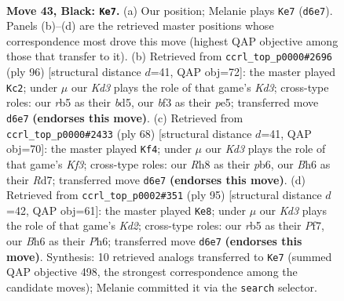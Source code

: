 \documentclass[11pt]{article}
\begin{document}
\clearpage

\begin{figure}[p]\centering
\begin{subfigure}{0.46\textwidth}\centering
\resizebox{\linewidth}{!}{%
\newchessgame
\chessboard[
  setfen={7r/2P2P2/R2k3b/1R6/1P3r1p/5B2/5K2/8 b - - 0 43},
  showmover=false,
  pgfstyle=straightmove, color=movearrow, markmove={d6-e7}
]}
\caption{}
\end{subfigure}\hfill
\begin{subfigure}{0.46\textwidth}\centering
\resizebox{\linewidth}{!}{%
\newchessgame
\chessboard[
  setfen={8/8/2p2k2/3bp2R/7P/r2K1P2/8/4R3 w - - 20 49},
  showmover=false,
  pgfstyle=straightmove, color=movearrow, markmove={d3-c2}
]}
\caption{}
\end{subfigure}
\\[4pt]
\begin{subfigure}{0.46\textwidth}\centering
\resizebox{\linewidth}{!}{%
\newchessgame
\chessboard[
  setfen={6k1/p2RR2p/1p6/8/P7/2r2KP1/7r/8 w - - 4 35},
  showmover=false,
  pgfstyle=straightmove, color=movearrow, markmove={f3-f4}
]}
\caption{}
\end{subfigure}\hfill
\begin{subfigure}{0.46\textwidth}\centering
\resizebox{\linewidth}{!}{%
\newchessgame
\chessboard[
  setfen={2r5/2Pk1pp1/7p/3R4/4P3/K7/7r/2R5 b - - 4 48},
  showmover=false,
  pgfstyle=straightmove, color=movearrow, markmove={d7-e8}
]}
\caption{}
\end{subfigure}
\caption{\textbf{Move 43, Black: \texttt{Ke7}.} (a) Our position; Melanie plays \texttt{Ke7} (\texttt{d6e7}). Panels (b)--(d) are the retrieved master positions whose correspondence most drove this move (highest QAP objective among those that transfer to it). (b) Retrieved from \texttt{ccrl\_top\_p0000\#2696} (ply 96) [structural distance $d$=41, QAP obj=72]: the master played \texttt{Kc2}; under $\mu$ our \emph{Kd3} plays the role of that game's \emph{Kd3}; cross-type roles: our \emph{r}b5 as their \emph{b}d5, our \emph{b}f3 as their \emph{p}e5; transferred move \texttt{d6e7} \textbf{(endorses this move)}. (c) Retrieved from \texttt{ccrl\_top\_p0000\#2433} (ply 68) [structural distance $d$=41, QAP obj=70]: the master played \texttt{Kf4}; under $\mu$ our \emph{Kd3} plays the role of that game's \emph{Kf3}; cross-type roles: our \emph{R}h8 as their \emph{p}b6, our \emph{B}h6 as their \emph{R}d7; transferred move \texttt{d6e7} \textbf{(endorses this move)}. (d) Retrieved from \texttt{ccrl\_top\_p0002\#351} (ply 95) [structural distance $d$=42, QAP obj=61]: the master played \texttt{Ke8}; under $\mu$ our \emph{Kd3} plays the role of that game's \emph{Kd2}; cross-type roles: our \emph{r}b5 as their \emph{P}f7, our \emph{B}h6 as their \emph{P}h6; transferred move \texttt{d6e7} \textbf{(endorses this move)}. Synthesis: 10 retrieved analogs transferred to \texttt{Ke7} (summed QAP objective 498, the strongest correspondence among the candidate moves); Melanie committed it via the \texttt{search} selector.}
\label{fig:thought-m85}
\end{figure}
\end{document}
